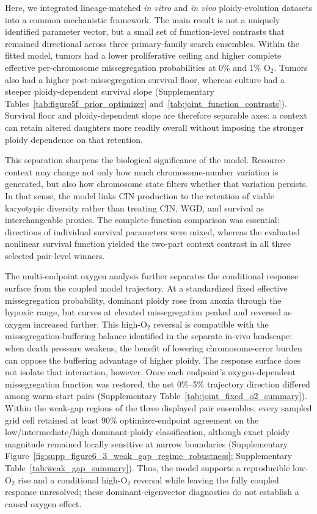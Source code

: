 \documentclass[11pt]{article}
\begin{document}
Here, we integrated lineage-matched \textit{in vitro} and \textit{in vivo} ploidy-evolution datasets into a common mechanistic framework. The main result is not a uniquely identified parameter vector, but a small set of function-level contrasts that remained directional across three primary-family search ensembles. Within the fitted model, tumors had a lower proliferative ceiling and higher complete effective per-chromosome missegregation probabilities at 0\% and 1\% O$_2$. Tumors also had a higher post-missegregation survival floor, whereas culture had a steeper ploidy-dependent survival slope (Supplementary Tables~\ref{tab:figure5f_prior_optimizer} and~\ref{tab:joint_function_contrasts}). Survival floor and ploidy-dependent slope are therefore separable axes: a context can retain altered daughters more readily overall without imposing the stronger ploidy dependence on that retention.

This separation sharpens the biological significance of the model. Resource context may change not only how much chromosome-number variation is generated, but also how chromosome state filters whether that variation persists. In that sense, the model links CIN production to the retention of viable karyotypic diversity rather than treating CIN, WGD, and survival as interchangeable proxies. The complete-function comparison was essential: directions of individual survival parameters were mixed, whereas the evaluated nonlinear survival function yielded the two-part context contrast in all three selected pair-level winners.

The multi-endpoint oxygen analysis further separates the conditional response surface from the coupled model trajectory. At a standardized fixed effective missegregation probability, dominant ploidy rose from anoxia through the hypoxic range, but curves at elevated missegregation peaked and reversed as oxygen increased further. This high-O$_2$ reversal is compatible with the missegregation-buffering balance identified in the separate in-vivo landscape: when death pressure weakens, the benefit of lowering chromosome-error burden can oppose the buffering advantage of higher ploidy. The response surface does not isolate that interaction, however. Once each endpoint's oxygen-dependent missegregation function was restored, the net 0\%--5\% trajectory direction differed among warm-start pairs (Supplementary Table~\ref{tab:joint_fixed_o2_summary}). Within the weak-gap regions of the three displayed pair ensembles, every sampled grid cell retained at least 90\% optimizer-endpoint agreement on the low/intermediate/high dominant-ploidy classification, although exact ploidy magnitude remained locally sensitive at narrow boundaries (Supplementary Figure~\ref{fig:supp_figure6_3_weak_gap_regime_robustness}; Supplementary Table~\ref{tab:weak_gap_summary}). Thus, the model supports a reproducible low-O$_2$ rise and a conditional high-O$_2$ reversal while leaving the fully coupled response unresolved; these dominant-eigenvector diagnostics do not establish a causal oxygen effect.
\end{document}

